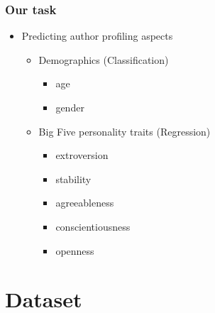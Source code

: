 \documentclass[slidestop,compress,11pt,xcolor=dvipsnames]{beamer}
\begin{document}

\begin{frame}
\frametitle{Our task}
\vspace{-2mm}
\begin{itemize}
\setlength\itemsep{2mm}
	\item Predicting author profiling aspects
	\begin{itemize}
		\item Demographics (Classification)
		\begin{itemize}
			\item age
			\item gender
		\end{itemize}
		\item Big Five personality traits (Regression)
		\begin{itemize}
			\item extroversion
			\item stability
			\item agreeableness
			\item conscientiousness
			\item openness
		\end{itemize}
	\end{itemize}
\end{itemize}
\end{frame}




\section{Dataset}

\end{document}
